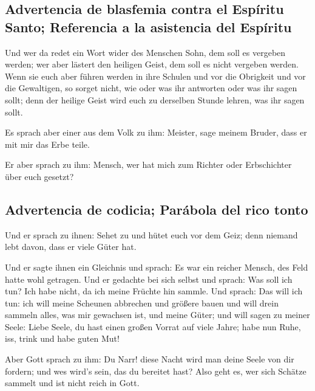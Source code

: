 \hypertarget{advertencia-de-blasfemia-contra-el-espuxedritu-santo-referencia-a-la-asistencia-del-espuxedritu}{%
\subsection{Advertencia de blasfemia contra el Espíritu Santo;
Referencia a la asistencia del
Espíritu}\label{advertencia-de-blasfemia-contra-el-espuxedritu-santo-referencia-a-la-asistencia-del-espuxedritu}}

 Und wer da redet ein Wort wider des Menschen Sohn, dem
soll es vergeben werden; wer aber lästert den heiligen Geist, dem soll
es nicht vergeben werden.  Wenn sie euch aber führen
werden in ihre Schulen und vor die Obrigkeit und vor die Gewaltigen, so
sorget nicht, wie oder was ihr antworten oder was ihr sagen sollt;
 denn der heilige Geist wird euch zu derselben Stunde
lehren, was ihr sagen sollt.

 Es sprach aber einer aus dem Volk zu ihm: Meister, sage
meinem Bruder, dass er mit mir das Erbe teile.

 Er aber sprach zu ihm: Mensch, wer hat mich zum Richter
oder Erbschichter über euch gesetzt?

\hypertarget{advertencia-de-codicia-paruxe1bola-del-rico-tonto}{%
\subsection{Advertencia de codicia; Parábola del rico
tonto}\label{advertencia-de-codicia-paruxe1bola-del-rico-tonto}}

 Und er sprach zu ihnen: Sehet zu und hütet euch vor dem
Geiz; denn niemand lebt davon, dass er viele Güter hat.

 Und er sagte ihnen ein Gleichnis und sprach: Es war ein
reicher Mensch, des Feld hatte wohl getragen.  Und er
gedachte bei sich selbst und sprach: Was soll ich tun? Ich habe nicht,
da ich meine Früchte hin sammle.  Und sprach: Das will
ich tun: ich will meine Scheunen abbrechen und größere bauen und will
drein sammeln alles, was mir gewachsen ist, und meine Güter;
 und will sagen zu meiner Seele: Liebe Seele, du hast
einen großen Vorrat auf viele Jahre; habe nun Ruhe, iss, trink und habe
guten Mut!

 Aber Gott sprach zu ihm: Du Narr! diese Nacht wird man
deine Seele von dir fordern; und wes wird's sein, das du bereitet hast?
 Also geht es, wer sich Schätze sammelt und ist nicht
reich in Gott.

